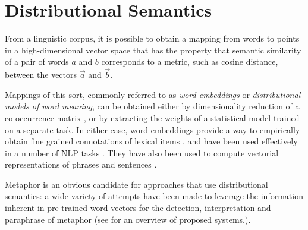 \documentclass[9pt,twocolumn,twoside,lineno]{pnas-new}
\begin{document}
	\section{Distributional Semantics} \label{distmods}

	From a linguistic corpus, it is possible to obtain a mapping from words to points in a high-dimensional vector space that has the property that semantic similarity of a pair of words $a$ and $b$ corresponds to a metric, such as cosine distance, between the vectors $\overrightarrow{a}$ and $\overrightarrow{b}$.

	Mappings of this sort, commonly referred to as \emph{word embeddings} or \emph{distributional models of word meaning}, can be obtained either by dimensionality reduction of a co-occurrence matrix \cite{pennington2014glove}, or by extracting the weights of a statistical model \cite{mikolov2013distributed,peters2018deep,devlin2018bert} trained on a separate task. In either case, word embeddings provide a way to empirically obtain fine grained connotations of lexical items \cite{mikolov2013distributed}, and have been used effectively in a number of NLP tasks \cite{dai2015semi,radford2018improving}. They have also been used to compute vectorial representations of phrases and sentences \cite{socher2013recursive, coecke2010mathematical}.


	

		

	Metaphor is an obvious candidate for approaches that use distributional semantics: a wide variety of attempts have been made to leverage the information inherent in pre-trained word vectors for the detection, interpretation and paraphrase of metaphor (see \cite{shutova2016design} for an overview of proposed systems.).
\end{document}
